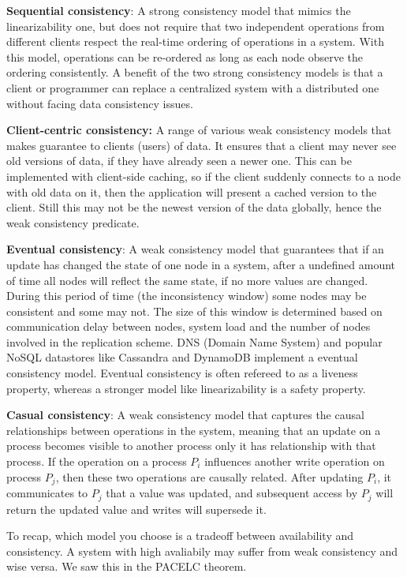 \noindent \textbf{Sequential consistency}: A strong consistency model that mimics the linearizability one, but does not require that two independent operations from different clients respect the real-time ordering of operations in a system. With this model, operations can be re-ordered as long as each node observe the ordering consistently. A benefit of the two strong consistency models is that a client or programmer can replace a centralized system with a distributed one without facing data consistency issues.

\noindent \textbf{Client-centric consistency:} A range of various weak consistency models that makes guarantee to clients (users) of data. It ensures that a client may never see old versions of data, if they have already seen a newer one. This can be implemented with client-side caching, so if the client suddenly connects to a node with old data on it, then the application will present a cached version to the client. Still this may not be the newest version of the data globally, hence the weak consistency predicate.

\noindent \textbf{Eventual consistency}: A weak consistency model that guarantees that if an update has changed the state of one node in a system, after a undefined amount of time all nodes will reflect the same state, if no more values are changed. During this period of time (the inconsistency window) some nodes may be consistent and some may not. The size of this window is determined based on communication delay between nodes, system load and the number of nodes involved in the replication scheme. DNS (Domain Name System) and popular NoSQL datastores like Cassandra and DynamoDB implement a eventual consistency model. Eventual consistency is often refereed to as a liveness property, whereas a stronger model like linearizability is a safety property.

\noindent \textbf{Casual consistency}: A weak consistency model that captures the causal relationships between operations in the system, meaning that an update on a process becomes visible to another process only it has relationship with that process. If the operation on a process $P_i$ influences another write operation on process $P_j$, then these two operations are causally related. After updating $P_i$, it communicates to $P_j$ that a value was updated, and subsequent access by $P_j$ will return the updated value and writes will supersede it.

\noindent To recap, which model you choose is a tradeoff between availability and consistency. A system with high avaliabily may suffer from weak consistency and wise versa. We saw this in the PACELC theorem.
